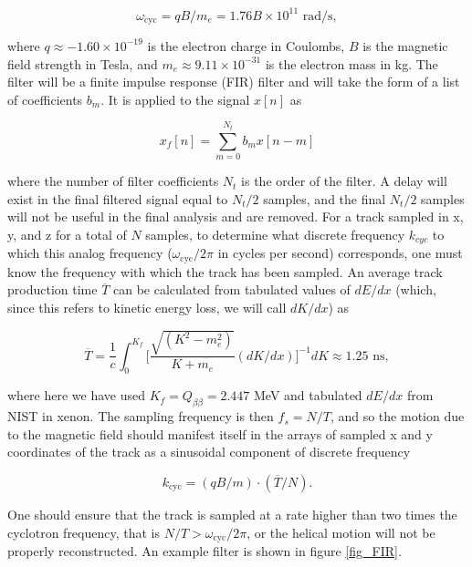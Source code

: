 \documentclass{JINST}
\begin{document}
\begin{equation}\label{eqn_wcyc}
\omega_{\mathrm{cyc}} = qB/m_{e} = 1.76B \times 10^{11} \,\, \mathrm{rad/s},
\end{equation}

\noindent where $q \approx -1.60 \times 10^{-19}$ is the electron charge in Coulombs, $B$ is the magnetic field
strength in Tesla, and $m_{e} \approx 9.11 \times 10^{-31}$ is the electron mass in kg.  The filter will be a finite impulse response (FIR) filter and will take the form of a  list of coefficients $b_{m}$.  It is applied to the signal $x[n]$ as

\begin{equation}
x_{f}[n] = \sum_{m=0}^{N_t} b_{m}x[n-m]
\end{equation}

\noindent where the number of filter coefficients $N_{t}$ is the order of the filter.  A delay will exist in the
final filtered signal equal to $N_{t}/2$ samples, and the final $N_{t}/2$ samples will not be useful in the final analysis and are removed.
For a track sampled in x, y, and z for a total of $N$ samples, to determine what discrete frequency $k_{cyc}$ to which this analog frequency ($\omega_{\mathrm{cyc}}/2\pi$ in cycles per second) corresponds, one must know the frequency with which the track has been sampled.  An average track production time $\overline{T}$ can be calculated from tabulated values of $dE/dx$ (which, since this refers to kinetic energy loss, we will call $dK/dx$) as

\begin{equation}\label{eqn_T}
\overline{T} = \frac{1}{c}\int_{0}^{K_{f}} \biggl[\frac{\sqrt{(K^2-m_e^2)}}{K+m_e}(dK/dx)\biggr]^{-1} dK \approx 1.25 \,\, \mathrm{ns},
\end{equation}

\noindent where here we have used $K_{f} = Q_{\beta\beta} = 2.447$ MeV and tabulated 
$dE/dx$ from NIST \cite{NIST_mac} in xenon.  The sampling frequency is then $f_{s} = N/T$, and so the motion
due to the magnetic field should manifest itself in the arrays of sampled x and y coordinates
of the track as a sinusoidal component of discrete frequency 

\begin{equation}\label{eqn_kcyc}
k_{\mathrm{cyc}} = (qB/m)\cdot(\overline{T}/N).
\end{equation}

\noindent One should ensure that the track is sampled at a rate higher than two times the cyclotron
frequency, that is $N/T > \omega_{\mathrm{cyc}}/2\pi$, or the helical motion will not be properly
reconstructed.  An example filter is shown in figure \ref{fig_FIR}.  
\end{document}
